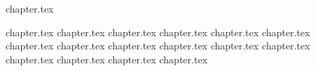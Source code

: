 \documentclass[twoside]{Sparkle}
\begin{document}
{chapter.tex}

{chapter.tex}
{chapter.tex}
{chapter.tex}
{chapter.tex}
{chapter.tex}
{chapter.tex}
{chapter.tex}
{chapter.tex}
{chapter.tex}
{chapter.tex}
{chapter.tex}
{chapter.tex}
{chapter.tex}
{chapter.tex}
{chapter.tex}
{chapter.tex}
\end{document}
